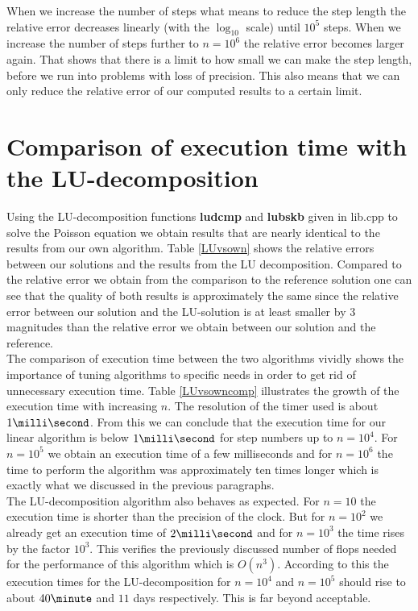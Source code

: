\documentclass[11pt,a4wide]{article}
\begin{document}
When we increase the number of steps what means to reduce the step length the relative error decreases linearly (with the $\log_{10}$ scale) until $10^5$ steps. When we increase the number of steps further to $n=10^6$ the relative error becomes larger again. That shows that there is a limit to how small we can make the step length, before we run into problems with loss of precision. This also means that we can only reduce the relative error of our computed results to a certain limit.        
\section{Comparison of execution time with the LU-decomposition}
Using the LU-decomposition functions \textbf{ludcmp} and \textbf{lubskb}  given in lib.cpp to solve the Poisson equation we obtain results that are nearly identical to the results from our own algorithm. Table \ref{LUvsown} shows the relative errors between our solutions and the results from the LU decomposition. Compared to the relative error we obtain from the comparison to the reference solution one can see that the quality of both results is approximately the same since the relative error between our solution and the LU-solution is at least smaller by $3$ magnitudes than the relative error we obtain between our solution and the reference. \vspace{0.2cm}
\\ 
The comparison of execution time between the two algorithms vividly shows the importance of tuning algorithms to specific needs in order to get rid of unnecessary execution time. Table \ref{LUvsowncomp} illustrates the growth of the execution time with increasing $n$. The resolution of the timer used is about $1\milli\second$. From this we can conclude that the execution time for our linear algorithm is below $1\milli\second$ for step numbers up to $n=10^4$. For $n=10^5$ we obtain an execution time of a few milliseconds and for $n=10^6$ the time to perform the algorithm was approximately ten times longer which is exactly what we discussed in the previous paragraphs.
 \vspace{0.2cm}
\\
The LU-decomposition algorithm also behaves as expected.  For $n=10$ the execution time is shorter than the precision of the clock. But for $n=10^2$ we already get an execution time of $2\milli\second$ and for $n=10^3$ the time rises by the factor $10^3$. This verifies the previously discussed number of flops needed for the performance of this algorithm which is $O(n^3)$. According to this the execution times for the LU-decomposition for $n=10^4$ and $n=10^5$ should rise to about $40\minute$ and $11$ days respectively. This is far beyond acceptable.
\end{document}
